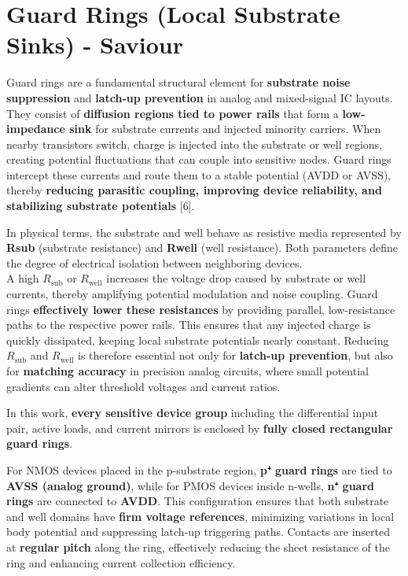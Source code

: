 \documentclass[
  11pt,
  a4paper,
  oneside]{scrbook}
\begin{document}
\section{Guard Rings (Local Substrate Sinks) -
Saviour}\label{guard-rings-local-substrate-sinks---saviour}

Guard rings are a fundamental structural element for \textbf{substrate
noise suppression} and \textbf{latch-up prevention} in analog and
mixed-signal IC layouts. They consist of \textbf{diffusion regions tied
to power rails} that form a \textbf{low-impedance sink} for substrate
currents and injected minority carriers. When nearby transistors switch,
charge is injected into the substrate or well regions, creating
potential fluctuations that can couple into sensitive nodes. Guard rings
intercept these currents and route them to a stable potential (AVDD or
AVSS), thereby \textbf{reducing parasitic coupling, improving device
reliability, and stabilizing substrate potentials} {[}6{]}.

In physical terms, the substrate and well behave as resistive media
represented by \textbf{Rsub} (substrate resistance) and \textbf{Rwell}
(well resistance). Both parameters define the degree of electrical
isolation between neighboring devices.\\
A high \(R_{\text{sub}}\) or \(R_{\text{well}}\) increases the voltage
drop caused by substrate or well currents, thereby amplifying potential
modulation and noise coupling. Guard rings \textbf{effectively lower
these resistances} by providing parallel, low-resistance paths to the
respective power rails. This ensures that any injected charge is quickly
dissipated, keeping local substrate potentials nearly constant. Reducing
\(R_{\text{sub}}\) and \(R_{\text{well}}\) is therefore essential not
only for \textbf{latch-up prevention}, but also for \textbf{matching
accuracy} in precision analog circuits, where small potential gradients
can alter threshold voltages and current ratios.

In this work, \textbf{every sensitive device group} including the
differential input pair, active loads, and current mirrors is enclosed
by \textbf{fully closed rectangular guard rings}.

For NMOS devices placed in the p-substrate region, \textbf{p⁺ guard
rings} are tied to \textbf{AVSS (analog ground)}, while for PMOS devices
inside n-wells, \textbf{n⁺ guard rings} are connected to \textbf{AVDD}.
This configuration ensures that both substrate and well domains have
\textbf{firm voltage references}, minimizing variations in local body
potential and suppressing latch-up triggering paths. Contacts are
inserted at \textbf{regular pitch} along the ring, effectively reducing
the sheet resistance of the ring and enhancing current collection
efficiency.
\end{document}
